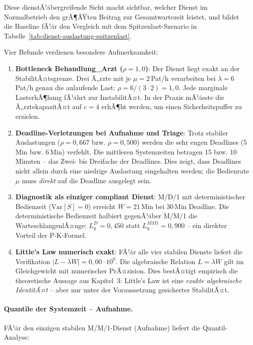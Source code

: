 ﻿\documentclass[a4paper,12pt]{report}
\theoremstyle{definition}
\begin{document}
Diese dienstÃ¼bergreifende Sicht macht sichtbar, welcher Dienst im Normalbetrieb den grÃ¶ÃŸten Beitrag zur Gesamtwartezeit leistet, und bildet die Baseline fÃ¼r den Vergleich mit dem Spitzenlast-Szenario in Tabelle~\ref{tab:dienst-auslastung-spitzenlast}.

Vier Befunde verdienen besondere Aufmerksamkeit:

\begin{enumerate}
	\item[-] \textbf{Bottleneck Behandlung\_Arzt ($\rho = 1{,}0$)}: Der
	Dienst liegt exakt an der StabilitÃ¤tsgrenze. Drei Ã„rzte mit je
	$\mu = 2$\,Pat/h verarbeiten bei $\lambda = 6$\,Pat/h genau
	die anlaufende Last: $\rho = 6/(3 \cdot 2) = 1{,}0$.
	Jede marginale LasterhÃ¶hung fÃ¼hrt zur InstabilitÃ¤t.
	In der Praxis mÃ¼sste die Ã„rztekapazitÃ¤t auf $c=4$ erhÃ¶ht werden,
	um einen Sicherheitspuffer zu erzielen.
	
	\item[-] \textbf{Deadline-Verletzungen bei Aufnahme und Triage}:
	Trotz stabiler Auslastungen ($\rho = 0{,}667$ bzw. $\rho = 0{,}500$)
	werden die sehr engen Deadlines (5\,Min bzw. 6\,Min) verfehlt.
	Die mittleren Systemzeiten betragen 15 bzw. 10\,Minuten --
	das Zwei- bis Dreifache der Deadlines. Dies zeigt, dass Deadlines
	nicht allein durch eine niedrige Auslastung eingehalten werden;
	die Bedienrate $\mu$ muss \emph{direkt} auf die Deadline ausgelegt sein.
	
	\item[-] \textbf{Diagnostik als einziger compliant Dienst}: M/D/1
	mit deterministischer Bedienzeit ($\mathrm{Var}[S]=0$) erreicht
	$W = 21$\,Min bei 30\,Min Deadline. Die deterministische Bedienzeit
	halbiert gegenÃ¼ber M/M/1 die WarteschlangenlÃ¤nge:
	$L_q^{D} = 0{,}450$ statt $L_q^{MM1} = 0{,}900$ -- ein direkter
	Vorteil der P-K-Formel.
	
	\item[-] \textbf{Little's Law numerisch exakt}:
	FÃ¼r alle vier stabilen Dienste liefert die Verifikation
	$|L - \lambda W| = 0{,}00 \cdot 10^0$. Die algebraische
	Relation $L = \lambda W$ gilt im Gleichgewicht mit numerischer
	PrÃ¤zision. Dies bestÃ¤tigt empirisch die theoretische Aussage aus
	Kapitel~3: Little's Law ist eine \emph{exakte algebraische IdentitÃ¤t}
	-- aber nur unter der Voraussetzung gesicherter StabilitÃ¤t.
\end{enumerate}

\paragraph{Quantile der Systemzeit -- Aufnahme.}
FÃ¼r den einzigen stabilen M/M/1-Dienst (Aufnahme) liefert die Quantil-Analyse:
\end{document}
